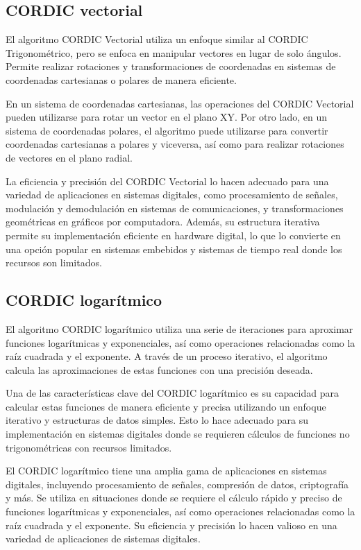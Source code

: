 \documentclass[12pt,a4paper, twoside]{article} %
\begin{document}
\subsection{CORDIC vectorial}
\label{sec:orgdaca22c}


El algoritmo CORDIC Vectorial utiliza un enfoque similar al CORDIC Trigonométrico, pero se enfoca en manipular vectores en lugar de solo ángulos. Permite realizar rotaciones y transformaciones de coordenadas en sistemas de coordenadas cartesianas o polares de manera eficiente. 

En un sistema de coordenadas cartesianas, las operaciones del CORDIC Vectorial pueden utilizarse para rotar un vector en el plano XY. Por otro lado, en un sistema de coordenadas polares, el algoritmo puede utilizarse para convertir coordenadas cartesianas a polares y viceversa, así como para realizar rotaciones de vectores en el plano radial.

La eficiencia y precisión del CORDIC Vectorial lo hacen adecuado para una variedad de aplicaciones en sistemas digitales, como procesamiento de señales, modulación y demodulación en sistemas de comunicaciones, y transformaciones geométricas en gráficos por computadora. Además, su estructura iterativa permite su implementación eficiente en hardware digital, lo que lo convierte en una opción popular en sistemas embebidos y sistemas de tiempo real donde los recursos son limitados.


\subsection{CORDIC logarítmico}
\label{sec:orgdaca22c}

El algoritmo CORDIC logarítmico utiliza una serie de iteraciones para aproximar funciones logarítmicas y exponenciales, así como operaciones relacionadas como la raíz cuadrada y el exponente. A través de un proceso iterativo, el algoritmo calcula las aproximaciones de estas funciones con una precisión deseada.

Una de las características clave del CORDIC logarítmico es su capacidad para calcular estas funciones de manera eficiente y precisa utilizando un enfoque iterativo y estructuras de datos simples. Esto lo hace adecuado para su implementación en sistemas digitales donde se requieren cálculos de funciones no trigonométricas con recursos limitados.

El CORDIC logarítmico tiene una amplia gama de aplicaciones en sistemas digitales, incluyendo procesamiento de señales, compresión de datos, criptografía y más. Se utiliza en situaciones donde se requiere el cálculo rápido y preciso de funciones logarítmicas y exponenciales, así como operaciones relacionadas como la raíz cuadrada y el exponente. Su eficiencia y precisión lo hacen valioso en una variedad de aplicaciones de sistemas digitales.
\end{document}
